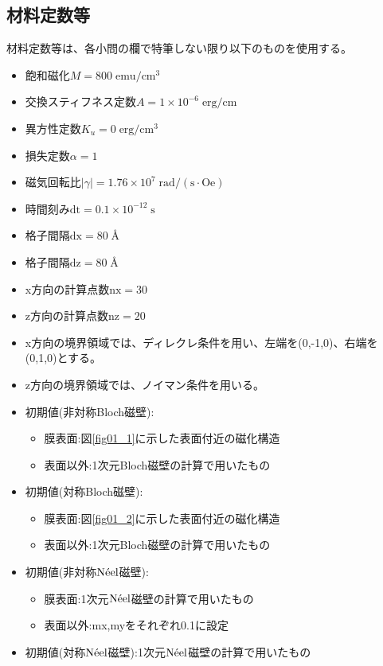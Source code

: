 \documentclass{jsarticle}
\begin{document}
\subsection{材料定数等}
材料定数等は、各小問の欄で特筆しない限り以下のものを使用する。
\begin{itemize}
	\item 飽和磁化$M = 800\;\mathrm{emu/cm^3}$
	\item 交換スティフネス定数$A = 1\times 10^{-6}\;\mathrm{erg/cm}$
	\item 異方性定数$K_u = 0\;\mathrm{erg/cm^3}$
	\item 損失定数$\alpha = 1$
	\item 磁気回転比$\lvert\gamma\rvert = 1.76\times 10^7\;\mathrm{rad/(s\cdot Oe)}$
	\item 時間刻み$\mathrm{dt} = 0.1\times 10^{-12}\;\mathrm{s}$
	\item 格子間隔$\mathrm{dx} = 80\;$\AA
	\item 格子間隔$\mathrm{dz} = 80\;$\AA
	\item x方向の計算点数$\mathrm{nx} = 30$
	\item z方向の計算点数$\mathrm{nz} = 20$
	\item x方向の境界領域では、ディレクレ条件を用い、左端を(0,-1,0)、右端を(0,1,0)とする。
	\item z方向の境界領域では、ノイマン条件を用いる。
	\item 初期値(非対称Bloch磁壁):
	\begin{itemize}
		\item 膜表面:図\ref{fig01_1}に示した表面付近の磁化構造
		\item 表面以外:1次元Bloch磁壁の計算で用いたもの
	\end{itemize}
	\item 初期値(対称Bloch磁壁):
	\begin{itemize}
		\item 膜表面:図\ref{fig01_2}に示した表面付近の磁化構造
		\item 表面以外:1次元Bloch磁壁の計算で用いたもの
	\end{itemize}
	\item 初期値(非対称$\mathrm{N\Acute{e}el}$磁壁):
	\begin{itemize}
		\item 膜表面:1次元$\mathrm{N\Acute{e}el}$磁壁の計算で用いたもの
		\item 表面以外:mx,myをそれぞれ0.1に設定
	\end{itemize}
	\item 初期値(対称$\mathrm{N\Acute{e}el}$磁壁):1次元$\mathrm{N\Acute{e}el}$磁壁の計算で用いたもの
\end{itemize}
\end{document}
